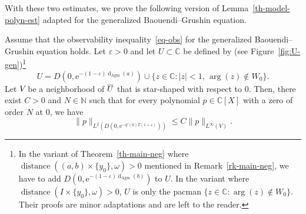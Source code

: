 \documentclass[AHL,Unicode,longabstracts,published]{cedram}
\renewcommand{\leq}{\leqslant}
\newcommand{\1}{\mathds 1}
\DeclareMathOperator{\distance}{distance}
\newcommand{\dagmon}{\mathop{\mathrm{d}}\nolimits_{\mathrm{Agm}}}
\newcommand{\C}{\mathbb{C}}
\newcommand{\N}{\mathbb{N}}
\newcommand{\eu}{\mathrm e}
\newcommand{\e}{\varepsilon}
\renewcommand{\o}{\omega}
\newcommand*{\noic}{\sb{}\kern-\scriptspace }
\renewcommand{\o}{\omega}
\begin{document}
With these two estimates, we prove the following version of Lemma~\ref{th-model-polyn-est} adapted for the generalized Baouendi--Grushin equation.


\begin{lemm}\label{th-polyn-est}
Assume that the observability inequality~\eqref{eq-obs} for the generalized Baouendi--Grushin equation holds. Let $\e>0$ and let $U\subset \C$ be defined by (see Figure~\ref{fig:U-gen})\footnote{
In the variant of Theorem~\ref{th-main-neg} where $\distance((a,b)\times\{y_0\},\o)>0$ mentioned in Remark~\ref{rk-main-neg}, we have to add $D(0,\eu^{-(1-\e)\dagmon(b)})$ to $U$. In the variant where $\distance(I\times\{y_0\},\o)>0$, $U$ is only the pacman $\{ z\in \C\colon \arg(z)\notin W_0 \}$. Their proofs are minor adaptations and are left to the reader.\label{foot-variant1}
}
\[
U = D \left(0, \eu^{-(1-\e)\dagmon(a)}\right) \cup
\{ z\in \C\colon |z|<1, \, \arg(z)\notin W_0 \}.
\]
Let $V\noic$ be a neighborhood of $\overline{U}\noic$ that is star-shaped with respect to $0$. Then, there exist $C>0$ and $N\in \N$ such that for every polynomial $p\in \C[X]$ with a zero of order $N$ at $0$, we have
\[
\|p\|_{L^2\left(D\left(0,\eu^{-q'(0) T(1+\e)}\right)\right)} \leq C \|p\|_{L^\infty(V)}.
\]
\end{lemm}
\end{document}
